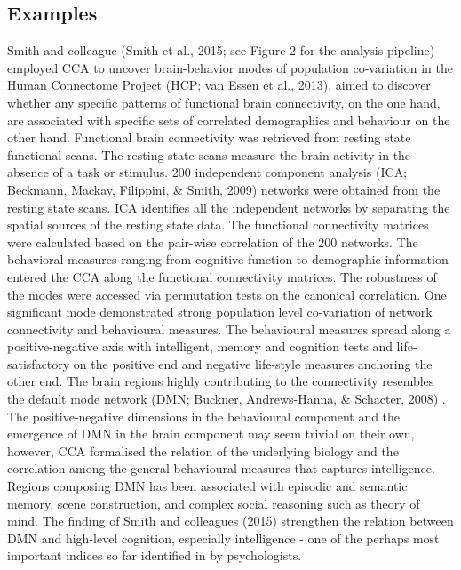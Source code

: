 \subsection{Examples}
Smith and colleague (Smith et al., 2015; see Figure 2 for the analysis pipeline) employed CCA to uncover brain-behavior modes of population co-variation in the Human Connectome Project (HCP; van Essen et al., 2013).  aimed to discover whether any specific patterns of functional brain connectivity, on the one hand, are associated with specific sets of correlated demographics and behaviour on the other hand. Functional brain connectivity was retrieved from resting state functional scans. The resting state scans measure the brain activity in the absence of a task or stimulus. 200 independent component analysis (ICA; Beckmann, Mackay, Filippini, \& Smith, 2009) networks were obtained from the resting state scans. ICA identifies all the independent networks by separating the spatial sources of the resting state data. The functional connectivity matrices were calculated based on the pair-wise correlation of the 200 networks. The behavioral measures ranging from cognitive function to demographic information entered the CCA along the functional connectivity matrices. The robustness of the modes were accessed via permutation tests on the canonical correlation. One significant mode demonstrated strong population level co-variation of network connectivity and behavioural measures. The behavioural measures spread along a positive-negative axis with intelligent, memory and cognition tests and life-satisfactory on the positive end and negative life-style measures anchoring the other end. The brain regions highly contributing to the connectivity resembles the default mode network  (DMN; Buckner, Andrews-Hanna, \& Schacter, 2008) . The positive-negative dimensions in the behavioural component and the emergence of DMN in the brain component may seem trivial on their own, however, CCA formalised the relation of the underlying biology and the correlation among the general behavioural measures that captures intelligence. Regions composing DMN has been associated with episodic and semantic memory, scene construction, and complex social reasoning such as theory of mind. The finding of Smith and colleagues (2015) strengthen the relation between DMN and high-level cognition, especially intelligence - one of the perhaps most important indices so far identified in by psychologists.

